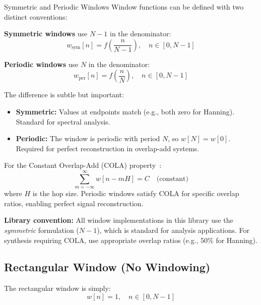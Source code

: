 \begin{concept}{Symmetric and Periodic Windows}
  Window functions can be defined with two distinct conventions:

  \textbf{Symmetric windows} use $N-1$ in the denominator:
  \begin{equation}
    w_{\text{sym}}[n] = f\left(\frac{n}{N-1}\right), \quad n \in [0, N-1]
  \end{equation}

  \textbf{Periodic windows} use $N$ in the denominator:
  \begin{equation}
    w_{\text{per}}[n] = f\left(\frac{n}{N}\right), \quad n \in [0, N-1]
  \end{equation}

  The difference is subtle but important:
  \begin{itemize}[itemsep=2pt]
    \item \textbf{Symmetric:} Values at endpoints match (e.g., both
      zero for Hanning). Standard for spectral analysis.
    \item \textbf{Periodic:} The window is periodic with period $N$,
      so $w[N] = w[0]$. Required for perfect reconstruction in
      overlap-add systems.
  \end{itemize}

  For the Constant Overlap-Add (COLA) property~\cite{harris1978use}:
  \begin{equation}
    \sum_{m=-\infty}^{\infty} w[n - mH] = C \quad \text{(constant)}
  \end{equation}
  where $H$ is the hop size. Periodic windows satisfy COLA for
  specific overlap ratios, enabling perfect signal reconstruction.

  \textbf{Library convention:} All window implementations in this
  library use the \emph{symmetric} formulation ($N-1$), which is
  standard for analysis applications. For synthesis requiring COLA,
  use appropriate overlap ratios (e.g., 50\% for Hanning).
\end{concept}

\subsection{Rectangular Window (No Windowing)}\label{subsec:rect_window}

The rectangular window is simply:
\begin{equation}
  \label{eq:rect_window}
  w[n] = 1, \quad n \in [0, N-1]
\end{equation}

